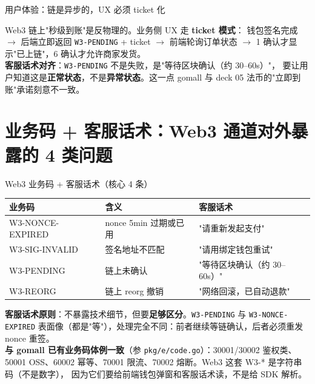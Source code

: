 \documentclass[aspectratio=169,11pt]{beamer}
\begin{document}
\begin{frame}[shrink]{用户体验：链是异步的，UX 必须 ticket 化}
\vspace{2mm}
\small Web3 链上"秒级到账"是反物理的。业务侧 UX 走 \textbf{ticket 模式}：
钱包签名完成 $\to$ 后端立即返回 \texttt{W3-PENDING} + ticket $\to$ 前端轮询订单状态 $\to$
1 确认才显示"已上链"，6 确认才允许商家发货。\\
\textbf{客服话术对齐}：\texttt{W3-PENDING} 不是失败，是"等待区块确认（约 30--60s）"，
要让用户知道这是\textbf{正常状态}，不是\textbf{异常状态}。这一点 gomall 与 deck 05 法币的"立即到账"承诺刻意不一致。
\end{frame}

\section{业务码 + 客服话术：Web3 通道对外暴露的 4 类问题}

\begin{frame}[shrink]{Web3 业务码 + 客服话术（核心 4 条）}
\begin{tabular}{@{}lll@{}}
\toprule
业务码            & 含义                    & 客服话术 \\
\midrule
W3-NONCE-EXPIRED  & nonce 5min 过期或已用 & "请重新发起支付" \\
W3-SIG-INVALID    & 签名地址不匹配          & "请用绑定钱包重试" \\
W3-PENDING        & 链上未确认              & "等待区块确认（约 30--60s）" \\
W3-REORG          & 链上 reorg 撤销         & "网络回滚，已自动退款" \\
\bottomrule
\end{tabular}
\vspace{2mm}
\small \textbf{客服话术原则}：不暴露技术细节，但要\textbf{足够区分}。\texttt{W3-PENDING} 与
\texttt{W3-NONCE-EXPIRED} 表面像（都是"等"），处理完全不同：前者继续等链确认，后者必须重发 nonce 重签。\\
\textbf{与 gomall 已有业务码体例一致}（参 \texttt{pkg/e/code.go}）：30001/30002 鉴权类、
50001 OSS、60002 幂等、70001 限流、70002 熔断。Web3 这套 W3-* 是字符串码（不是数字），
因为它们要给前端钱包弹窗和客服话术读，不是给 SDK 解析。
\end{frame}
\end{document}
